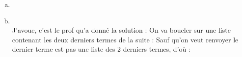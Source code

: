 \begin{enumerate}[(a)]
  \item {}\\

  \item {}
        \\
        J'avoue, c'est le prof qu'a donné la solution :
        On va boucler sur une liste contenant les deux derniers termes de la suite : 
        Sauf qu'on veut renvoyer le dernier terme est pas une liste des 2 derniers termes, d'où :


\end{enumerate}
